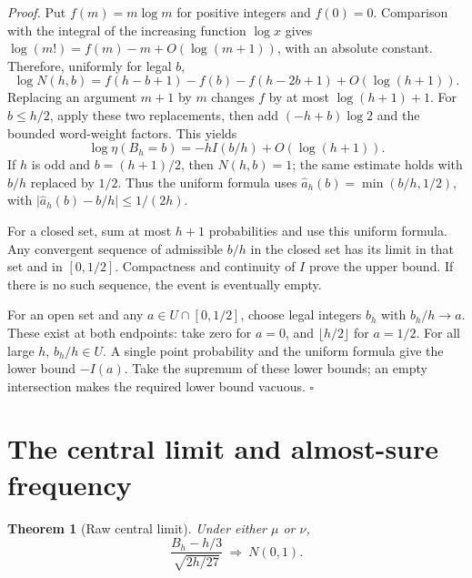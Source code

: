 \documentclass[11pt,letterpaper]{article}
\newtheorem{theorem}{Theorem}
\newenvironment{proof}{\noindent\textit{Proof.}}{\hfill\(\square\)}
\begin{document}
\begin{proof}
Put \(f(m)=m\log m\) for positive integers and \(f(0)=0\).
Comparison with the integral of the increasing function \(\log x\)
gives \(\log(m!)=f(m)-m+O(\log(m+1))\), with an absolute constant.
Therefore, uniformly for legal \(b\),
\[
\log N(h,b)
=f(h-b+1)-f(b)-f(h-2b+1)+O(\log(h+1)).
\]
Replacing an argument \(m+1\) by \(m\) changes \(f\) by at most
\(\log(h+1)+1\). For \(b\le h/2\), apply these two replacements,
then add \((-h+b)\log2\) and the bounded word-weight factors.
This yields
\[
\log\eta(B_h=b)=-hI(b/h)+O(\log(h+1)).
\]
If \(h\) is odd and \(b=(h+1)/2\), then \(N(h,b)=1\);
the same estimate holds with \(b/h\) replaced by \(1/2\).
Thus the uniform formula uses
\(\widehat a_h(b)=\min(b/h,1/2)\), with
\(\lvert\widehat a_h(b)-b/h\rvert\le1/(2h)\).

For a closed set, sum at most \(h+1\) probabilities and use this
uniform formula. Any convergent sequence of admissible \(b/h\) in
the closed set has its limit in that set and in \([0,1/2]\).
Compactness and continuity of \(I\) prove the upper bound.
If there is no such sequence, the event is eventually empty.

For an open set and any \(a\in U\cap[0,1/2]\), choose legal
integers \(b_h\) with \(b_h/h\to a\). These exist at both endpoints:
take zero for \(a=0\), and \(\lfloor h/2\rfloor\) for \(a=1/2\).
For all large \(h\), \(b_h/h\in U\). A single point probability
and the uniform formula give the lower bound \(-I(a)\).
Take the supremum of these lower bounds; an empty intersection
makes the required lower bound vacuous.
\end{proof}

\section{The central limit and almost-sure frequency}

\begin{theorem}[Raw central limit]
\label{thm:clt}
Under either \(\mu\) or \(\nu\),
\[
\frac{B_h-h/3}{\sqrt{2h/27}}
\ \Longrightarrow\ N(0,1).
\]
\end{theorem}
\end{document}
